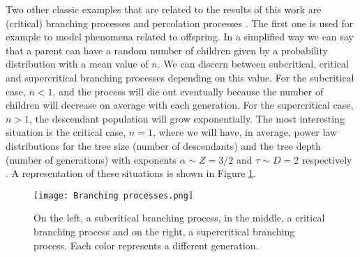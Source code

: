 Two other classic examples that are related to the results of this work are (critical) branching processes \cite{harris1963theory} and percolation processes \cite{stauffer2018introduction}. 
The first one is used for example to model phenomena 
related to offspring. In a simplified way we can say that a parent can have a random number of children given by a probability distribution with a mean value of $n$. We can discern between
subcritical, critical and supercritical branching processes depending on this value. For the subcritical case, $n<1$, and the process will die out eventually because the number of children
will decrease on average with each generation. For the supercritical case, $n>1$, the descendant population will grow exponentially. The most interesting situation is the critical case, $n=1$, 
where we will have, in average, power law distributions for the tree size (number of descendants) and the tree depth (number of generations) with exponents $\alpha\sim Z=3/2$ and $\tau\sim D=2$ respectively 
\cite{notarmuzi2021percolation}. A representation of these situations is shown in Figure \ref{f:branching_processes}.

\begin{figure}[H]
    \centering
    \texttt{[image: Branching processes.png]}
    \caption{On the left, a subcritical branching process, in the middle, a critical branching process and on the right, a supercritical branching process. Each color represents a different
    generation.}
    \label{f:branching_processes}   
\end{figure}


